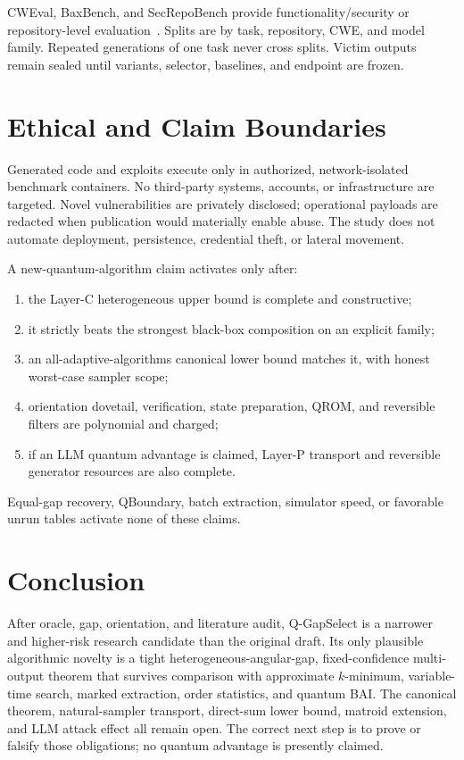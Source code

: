 \documentclass[10pt]{article}
\theoremstyle{definition}
\begin{document}
CWEval, BaxBench, and SecRepoBench provide functionality/security or
repository-level evaluation~\cite{peng2025cweval,vero2025baxbench,shen2026secrepobench}.
Splits are by task, repository, CWE, and model family.  Repeated generations of
one task never cross splits.  Victim outputs remain sealed until variants,
selector, baselines, and endpoint are frozen.

\section{Ethical and Claim Boundaries}

Generated code and exploits execute only in authorized, network-isolated
benchmark containers.  No third-party systems, accounts, or infrastructure are
targeted.  Novel vulnerabilities are privately disclosed; operational payloads
are redacted when publication would materially enable abuse.  The study does not
automate deployment, persistence, credential theft, or lateral movement.

A new-quantum-algorithm claim activates only after:
\begin{enumerate}[leftmargin=*]
  \item the Layer-C heterogeneous upper bound is complete and constructive;
  \item it strictly beats the strongest black-box composition on an explicit
  family;
  \item an all-adaptive-algorithms canonical lower bound matches it, with honest
  worst-case sampler scope;
  \item orientation dovetail, verification, state preparation, QROM, and
  reversible filters are polynomial and charged;
  \item if an LLM quantum advantage is claimed, Layer-P transport and reversible
  generator resources are also complete.
\end{enumerate}
Equal-gap recovery, QBoundary, batch extraction, simulator speed, or favorable
unrun tables activate none of these claims.

\section{Conclusion}

After oracle, gap, orientation, and literature audit, Q-GapSelect is a narrower
and higher-risk research candidate than the original draft.  Its only plausible
algorithmic novelty is a tight heterogeneous-angular-gap, fixed-confidence
multi-output theorem that survives comparison with approximate $k$-minimum,
variable-time search, marked extraction, order statistics, and quantum BAI.  The
canonical theorem, natural-sampler transport, direct-sum lower bound, matroid
extension, and LLM attack effect all remain open.  The correct next step is to
prove or falsify those obligations; no quantum advantage is presently claimed.



\end{document}
